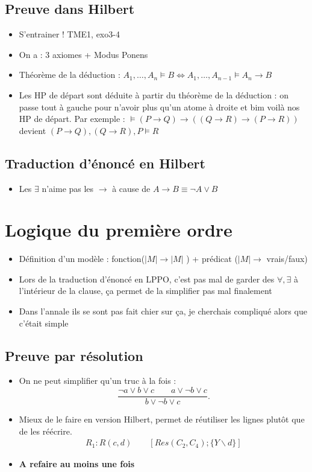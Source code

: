 \documentclass{article}
\theoremstyle{plain}%
\theoremstyle{definition}
\theoremstyle{remark}
\begin{document}
\subsection{Preuve dans Hilbert}
\begin{itemize}
    \item S'entrainer ! TME1, exo3-4
    \item On a : 3 axiomes + Modus Ponens
    \item Théorème de la déduction : $ A_1, \dots, A_n \models B \Leftrightarrow A_1, \dots, A_{n-1} \models A_n \to B$ 
    \item Les HP de départ sont déduite à partir du théorème de la déduction : on passe tout à gauche pour n'avoir plus qu'un atome à droite et bim voilà nos HP de départ. Par exemple : $ \models (P \to Q) \to ((Q \to R) \to (P \to R)) $ devient $ (P \to Q), (Q \to R), P \models R  $  
\end{itemize}

\subsection{Traduction d'énoncé en Hilbert}
\begin{itemize}
    \item Les $ \exists  $ n'aime pas les $ \rightarrow  $ à cause de $ A \to B \equiv \neg A \vee B $
\end{itemize}

\section{Logique du première ordre}
\begin{itemize}
    \item Définition d'un modèle : fonction($ \left| M \right| \to \left| M \right|  $ ) + prédicat ($ \left| M \right| \to  $ vrais/faux)
    \item Lors de la traduction d'énoncé en LPPO, c'est pas mal de garder des $ \forall, \exists  $ à l'intérieur de la clause, ça permet de la simplifier pas mal finalement
    \item Dans l'annale ils se sont pas fait chier sur ça, je cherchais compliqué alors que c'était simple 
\end{itemize}

\subsection{Preuve par résolution}
\begin{itemize}
    \item On ne peut simplifier qu'un truc à la fois : 
        \[
            \frac{\neg a \vee b \vee c \qquad a \vee \neg b \vee c }{b \vee \neg b \vee c}
        .\]
    \item Mieux de le faire en version Hilbert, permet de réutiliser les lignes plutôt que de les réécrire.
        \begin{align*}
            R_1 : R(c,d) \qquad [Res(C_2, C_4) ; \{Y\backslash d\}]
        \end{align*}
    \item \textbf{A refaire au moins une fois}
\end{itemize}
\end{document}
